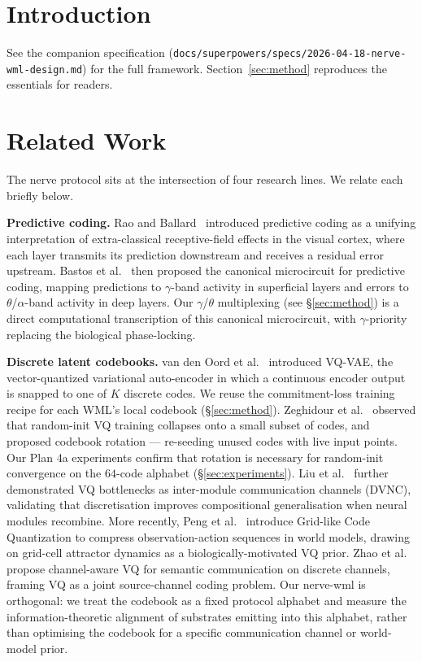 \documentclass[10pt,twocolumn]{article}
\begin{document}
\section{Introduction}
See the companion specification (\texttt{docs/superpowers/specs/2026-04-18-nerve-wml-design.md})
for the full framework. Section~\ref{sec:method} reproduces the
essentials for readers.

\section{Related Work}

The nerve protocol sits at the intersection of four research lines. We relate each briefly below.

\textbf{Predictive coding.} Rao and Ballard~\cite{rao1999predictive} introduced predictive coding as a unifying interpretation of extra-classical receptive-field effects in the visual cortex, where each layer transmits its prediction downstream and receives a residual error upstream. Bastos et al.~\cite{bastos2012canonical} then proposed the canonical microcircuit for predictive coding, mapping predictions to $\gamma$-band activity in superficial layers and errors to $\theta$/$\alpha$-band activity in deep layers. Our $\gamma$/$\theta$ multiplexing (see \S\ref{sec:method}) is a direct computational transcription of this canonical microcircuit, with $\gamma$-priority replacing the biological phase-locking.

\textbf{Discrete latent codebooks.} van den Oord et al.~\cite{vandenoord2017neural} introduced VQ-VAE, the vector-quantized variational auto-encoder in which a continuous encoder output is snapped to one of $K$ discrete codes. We reuse the commitment-loss training recipe for each WML's local codebook (\S\ref{sec:method}). Zeghidour et al.~\cite{zeghidour2022soundstream} observed that random-init VQ training collapses onto a small subset of codes, and proposed codebook rotation --- re-seeding unused codes with live input points. Our Plan 4a experiments confirm that rotation is necessary for random-init convergence on the $64$-code alphabet (\S\ref{sec:experiments}). Liu et al.~\cite{liu2021dvnc} further demonstrated VQ bottlenecks as inter-module communication channels (DVNC), validating that discretisation improves compositional generalisation when neural modules recombine. More recently, Peng et al.~\cite{peng2025gridlikevq} introduce Grid-like Code Quantization to compress observation-action sequences in world models, drawing on grid-cell attractor dynamics as a biologically-motivated VQ prior. Zhao et al.~\cite{zhao2025channelawarevq} propose channel-aware VQ for semantic communication on discrete channels, framing VQ as a joint source-channel coding problem. Our nerve-wml is orthogonal: we treat the codebook as a fixed protocol alphabet and measure the information-theoretic alignment of substrates emitting into this alphabet, rather than optimising the codebook for a specific communication channel or world-model prior.
\end{document}
